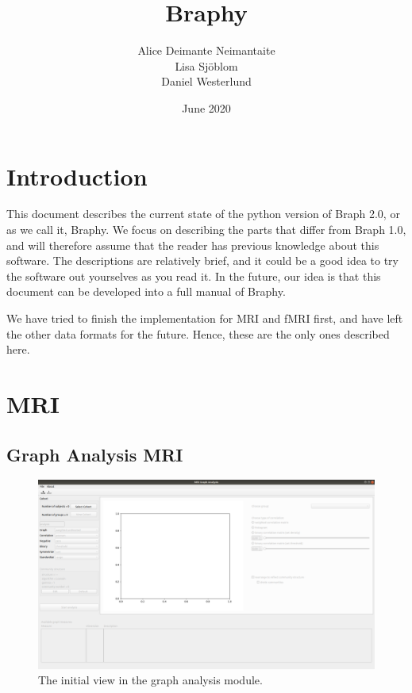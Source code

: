 \documentclass{article}
\title{Braphy}
\author{Alice Deimante Neimantaite \\ Lisa Sjöblom \\ Daniel Westerlund}
\date{June 2020}
\begin{document}
\maketitle
\clearpage

\section{Introduction}

This document describes the current state of the python version of Braph 2.0, or as we call it, Braphy. We focus on describing the parts that differ from Braph 1.0, and will therefore assume that the reader has previous knowledge about this software. The descriptions are relatively brief, and it could be a good idea to try the software out yourselves as you read it. In the future, our idea is that this document can be developed into a full manual of Braphy.

We have tried to finish the implementation for MRI and fMRI first, and have left the other data formats for the future. Hence, these are the only ones described here.


\section{MRI}

\subsection{Graph Analysis MRI}


\begin{figure}[h]
    \centering
    \includegraphics[width=\linewidth]{graph_analysis_locked.png}
    \caption{The initial view in the graph analysis module.}
    \label{fig:locked}
\end{figure}
\end{document}
